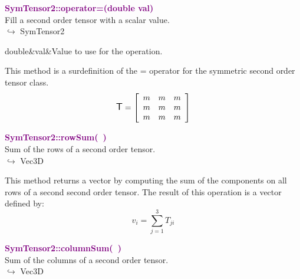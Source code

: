 \textcolor{purple}{\textbf{SymTensor2::operator=(double val)}}\label{SymTensor2::operator=(double val)}\\
Fill a second order tensor with a scalar value.\\ \hspace*{10mm}$\hookrightarrow$ SymTensor2

\begin{tcolorbox}[width=\textwidth,myArgs,tabularx={ll|R},title=Arguments of SymTensor2::operator=]
double&val&Value to use for the operation.
\end{tcolorbox}

This method is a surdefinition of the = operator for the symmetric second order tensor class.
\begin{equation*}
\mbox{\large\ensuremath{\mathsf{T}}}=\left[\begin{array}{ccc}
m&m&m\\
m&m&m\\
m&m&m
\end{array}\right]
\end{equation*}

\textcolor{purple}{\textbf{SymTensor2::rowSum(~)}}\label{SymTensor2::rowSum()}\\
Sum of the rows of a second order tensor.\\ \hspace*{10mm}$\hookrightarrow$ Vec3D

This method returns a vector by computing the sum of the components on all rows of a second second order tensor.
The result of this operation is a vector defined by:
\begin{equation*}
v_{i}=\sum_{j=1}^{3} T_{ji}
\end{equation*}

\textcolor{purple}{\textbf{SymTensor2::columnSum(~)}}\label{SymTensor2::columnSum()}\\
Sum of the columns of a second order tensor.\\ \hspace*{10mm}$\hookrightarrow$ Vec3D

